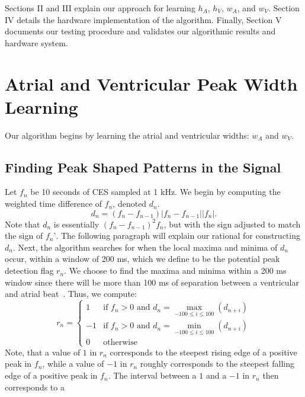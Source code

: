 \documentclass[conference]{IEEEtran}
\newcommand{\APW}{\ensuremath{w_A}}
\newcommand{\VPW}{\ensuremath{w_V}}
\newcommand{\APH}{\ensuremath{h_A}}
\newcommand{\VPH}{\ensuremath{h_V}}
\begin{document}
Sections II and III explain our approach
for learning \APH{}, \VPH{}, \APW{}, and \VPW{}. Section IV
details the hardware implementation of the algorithm.
Finally, Section V documents our testing procedure and
validates our algorithmic results and hardware system.

\section{Atrial and Ventricular Peak Width Learning}
Our algorithm begins by learning the atrial and ventricular widths: \APW{} and \VPW{}.

\subsection{Finding Peak Shaped Patterns in the Signal}
Let $f_n$ be 10 seconds of CES sampled at 1 kHz.
We begin by computing the weighted time
difference of $f_n$, denoted $d_n$.
\begin{equation*}
	d_n=(f_n-f_{n-1})\left|f_n - f_{n-1}\right| \left|f_n\right|.
\end{equation*}
Note that $d_n$ is essentially $(f_n-f_{n-1})^2  f_n$, but with the sign adjusted to match the sign of $f_n’$.
The following paragraph will explain our rational for constructing $d_n$. Next, the algorithm 
searches for when the local
maxima and minima of $d_n$ occur, within a window of
200 ms, which we define to be the potential peak detection flag $r_n$.  
We choose to find the maxima and minima within a 200 ms window since there will be more than 100 ms of separation between a ventricular 
and atrial beat~\cite{cardiac-cycle}. Thus, we compute:
\begin{equation*}
	r_n = \left \{
		\begin{array}{lc}
			1 & \text{if } f_n>0 \text{ and } d_n = \max\limits_{-100 \le i \le 100} (d_{n+i}) \\
			-1 & \text{if } f_n>0 \text{ and }  d_n = \min\limits_{-100 \le i \le 100} (d_{n+i}) \\
			0 & \text{otherwise}
		\end{array}
	\right.
\end{equation*}
Note, that a value of $1$ in $r_n$ corresponds to the
steepest rising edge of a positive peak in $f_n$, while a value of $-1$
in $r_n$ roughly corresponds to the steepest falling edge of a positive peak
in $f_n$. 
The interval between a $1$ and a $-1$ in $r_n$ then corresponds to a
\end{document}
